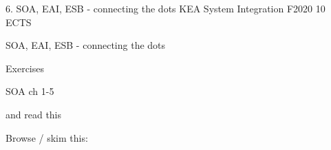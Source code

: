 \documentclass[Screen16to9,17pt]{foils}
\begin{document}
\mytitlepage
{6. SOA, EAI, ESB - connecting the dots}
{KEA System Integration F2020 10 ECTS}


\begin{list2}
\item
SOA, EAI, ESB - connecting the dots


\item
\item
\end{list2}

Exercises
\begin{list2}
\item
\item
\end{list2}




\begin{list1}
\item SOA ch 1-5

and read this\\

\item Browse / skim this:\\

\end{list1}




\slidenext
\end{document}
